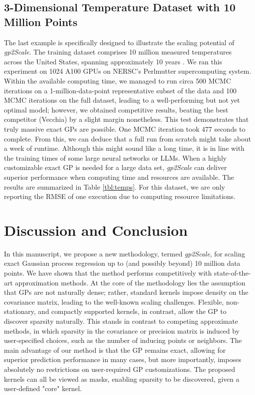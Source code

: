 \documentclass{article}
\begin{document}
\subsection{3-Dimensional Temperature Dataset with 10 Million Points}
The last example is specifically designed to illustrate the scaling potential of \emph{gp2Scale}. The training dataset comprises 10 million measured temperatures across the United States, spanning approximately 10 years \citep{Menne2012}. We ran this experiment on 1024 A100 GPUs on NERSC's Perlmutter supercomputing system. Within the available computing time, we managed to run circa 500 MCMC iterations on a 1-million-data-point representative subset of the data and 100 MCMC iterations on the full dataset, leading to a well-performing but not yet optimal model; however, we obtained competitive results, beating the best competitor (Vecchia) by a slight margin nonetheless. This test demonstrates that truly massive exact GPs are possible. One MCMC iteration took 477 seconds to complete. From this, we can deduce that a full run from scratch might take about a week of runtime. Although this might sound like a long time, it is in line with the training times of some large neural networks or LLMs. When a highly customizable exact GP is needed for a large data set, \emph{gp2Scale} can deliver superior performance when computing time and resources are available. The results are summarized in Table \ref{tbl:temps}. For this dataset, we are only reporting the RMSE of one execution due to computing resource limitations. 


\section{Discussion and Conclusion}
In this manuscript, we propose a new methodology, termed \emph{gp2Scale}, for scaling exact Gaussian process regression up to (and possibly beyond) 10 million data points. We have shown that the method performs competitively with state-of-the-art approximation methods. At the core of the methodology lies the assumption that GPs are not naturally dense; rather, standard kernels impose density on the covariance matrix, leading to the well-known scaling challenges. Flexible, non-stationary, and compactly supported kernels, in contrast, allow the GP to discover sparsity naturally. This stands in contrast to competing approximate methods, in which sparsity in the covariance or precision matrix is induced by user-specified choices, such as the number of inducing points or neighbors. The main advantage of our method is that the GP remains exact, allowing for superior prediction performance in many cases, but more importantly, imposes absolutely no restrictions on user-required GP customizations. The proposed kernels can all be viewed as masks, enabling sparsity to be discovered, given a user-defined "core" kernel. 
\end{document}
